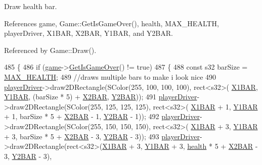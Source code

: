Draw health bar. 



 

 

References game, Game\-::\-Get\-Is\-Game\-Over(), health, M\-A\-X\-\_\-\-H\-E\-A\-L\-T\-H, player\-Driver, X1\-B\-A\-R, X2\-B\-A\-R, Y1\-B\-A\-R, and Y2\-B\-A\-R.



Referenced by Game\-::\-Draw().


\begin{DoxyCode}
485 \{
486     \textcolor{keywordflow}{if} (\hyperlink{_player_8cpp_a58bdb5643d0814ac4e697a1564b79b70}{game}->\hyperlink{class_game_a472e76af50d5275142522f9a5e149ab1}{GetIsGameOver}() != \textcolor{keyword}{true})
487     \{
488         \textcolor{keyword}{const} s32 barSize = \hyperlink{_player_8cpp_a2cf38e1cf676620c959917828e2eac9d}{MAX\_HEALTH};
489         \textcolor{comment}{//draws multiple bars to make i look nice}
490         \hyperlink{_player_8cpp_a13cc81ce093ff81a376551471a3de042}{playerDriver}->draw2DRectangle(SColor(255, 100, 100, 100), rect<s32>(
      \hyperlink{_player_8cpp_a7cb474282a6bf639f4c724367e07267f}{X1BAR}, \hyperlink{_player_8cpp_a7e48abcacca9302e3cc4a136b8ebaa13}{Y1BAR}, (barSize * 5) + \hyperlink{_player_8cpp_a661d6c128cdad1a108abd296bc6a8aa0}{X2BAR}, \hyperlink{_player_8cpp_aa47b191301cdb9c6164268899b0a0c5f}{Y2BAR}));
491         \hyperlink{_player_8cpp_a13cc81ce093ff81a376551471a3de042}{playerDriver}->draw2DRectangle(SColor(255, 125, 125, 125), rect<s32>(
      \hyperlink{_player_8cpp_a7cb474282a6bf639f4c724367e07267f}{X1BAR} + 1, \hyperlink{_player_8cpp_a7e48abcacca9302e3cc4a136b8ebaa13}{Y1BAR} + 1, barSize * 5 + \hyperlink{_player_8cpp_a661d6c128cdad1a108abd296bc6a8aa0}{X2BAR} - 1, \hyperlink{_player_8cpp_aa47b191301cdb9c6164268899b0a0c5f}{Y2BAR} - 1));
492         \hyperlink{_player_8cpp_a13cc81ce093ff81a376551471a3de042}{playerDriver}->draw2DRectangle(SColor(255, 150, 150, 150), rect<s32>(
      \hyperlink{_player_8cpp_a7cb474282a6bf639f4c724367e07267f}{X1BAR} + 3, \hyperlink{_player_8cpp_a7e48abcacca9302e3cc4a136b8ebaa13}{Y1BAR} + 3, barSize * 5 + \hyperlink{_player_8cpp_a661d6c128cdad1a108abd296bc6a8aa0}{X2BAR} - 3, \hyperlink{_player_8cpp_aa47b191301cdb9c6164268899b0a0c5f}{Y2BAR} - 3));
493         \hyperlink{_player_8cpp_a13cc81ce093ff81a376551471a3de042}{playerDriver}->draw2DRectangle(rect<s32>(\hyperlink{_player_8cpp_a7cb474282a6bf639f4c724367e07267f}{X1BAR} + 3, 
      \hyperlink{_player_8cpp_a7e48abcacca9302e3cc4a136b8ebaa13}{Y1BAR} + 3, \hyperlink{_player_8cpp_ae436015bd00ce552ac0bc6eefe3b8e00}{health} * 5 + \hyperlink{_player_8cpp_a661d6c128cdad1a108abd296bc6a8aa0}{X2BAR} - 3, \hyperlink{_player_8cpp_aa47b191301cdb9c6164268899b0a0c5f}{Y2BAR} - 3),

\end{DoxyCode}
